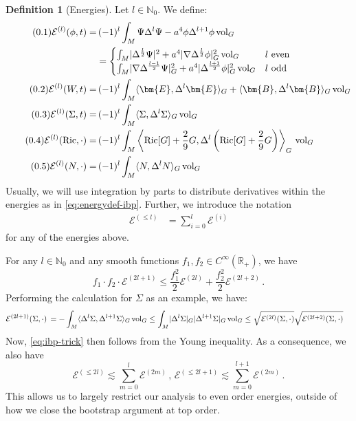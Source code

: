 \documentclass[11pt,leqno,textwidth=10cm]{amsart}
\numberwithin{equation}{section}
\theoremstyle{definition}
\newtheorem{definition}{Definition}[section]
\theoremstyle{plain}
\newcommand{\1}{\mathbbm{1}}
\newcommand{\E}{\mathcal{E}}
\newcommand{\N}{\mathbb{N}}
\newcommand{\R}{\mathbb{R}}
\newcommand{\Ric}{\text{\normalfont{Ric}}}
\newcommand{\vol}[1]{{\text{\normalfont{vol}}}_{#1}}
\newcommand{\Lap}{\Delta}
\newcommand{\numberthis}{\addtocounter{equation}{1}\tag{\theequation}}
\renewcommand{\theequation}{\arabic{section}.\arabic{equation}}
\newcommand{\RE}{\bm{E}}
\newcommand{\RB}{\bm{B}}
\begin{document}
\begin{definition}[Energies]\label{def:energies}
Let $l\in\N_0$. We define:
\begin{subequations}
\begin{align*}
\numberthis\E^{(l)}(\phi,t)=&\,(-1)^l\int_M\Psi\Lap^l\Psi-a^4\phi\Lap^{l+1}\phi\,\vol{G}\\
\label{eq:energydef-ibp}&=\begin{cases}
\int_M\lvert\Lap^\frac{l}2\Psi\rvert^2+a^4\lvert\nabla\Lap^\frac{l}2\phi\rvert_G^2\,\vol{G} & l\text{ even}\\
\int_M\lvert\nabla\Lap^\frac{l-1}2\Psi\rvert_G^2+a^4\lvert\Lap^\frac{l+1}2\phi\rvert_G^2\,\vol{G} & l\text{ odd}
\end{cases}\\
\numberthis\E^{(l)}(W,t)=&\,(-1)^l\int_M \langle\RE,\Lap^l \RE\rangle_G +\langle\RB,\Lap^l\RB\rangle_G\,\vol{G}\\
\numberthis\E^{(l)}(\Sigma,t)=&\,(-1)^l\int_M\langle\Sigma,\Lap^l\Sigma\rangle_G\,\vol{G}\\
\numberthis\E^{(l)}(\Ric,\cdot)=&\,(-1)^l\int_M\left\langle \Ric[G]+\frac29G,\Lap^l\left(\Ric[G]+\frac29G\right)\right\rangle_G\,\vol{G}\\
\numberthis\E^{(l)}(N,\cdot)=&\,(-1)^l\int_M\langle N,\Lap^lN\rangle_G\,\vol{G}
\end{align*}
\end{subequations}
Usually, we will use integration by parts to distribute derivatives within the energies as in \eqref{eq:energydef-ibp}. Further, we introduce the notation
\begin{align}
\E^{(\leq l)}&=\sum_{i=0}^l\E^{(i)}
\end{align}
for any of the energies above.
\end{definition}
\noindent For any $l\in\N_0$ and any smooth functions $f_1,f_2\in C^\infty(\R_+)$, we have
\begin{equation}\label{eq:ibp-trick}
f_1\cdot f_2\cdot\E^{(2l+1)}\leq \frac{f_1^2}2\E^{(2l)}+\frac{f_2^2}2\E^{(2l+2)}\,.
\end{equation}
Performing the calculation for $\Sigma$ as an example, we have:
\begin{align*}
\E^{(2l+1)}(\Sigma,\cdot)&\,=-\int_M \langle\Lap^l\Sigma,\Lap^{l+1}\Sigma\rangle_G\,\vol{G}\leq \int_M\lvert\Lap^l\Sigma\rvert_G\lvert\Lap^{l+1}\Sigma\rvert_G\,\vol{G}\leq \sqrt{\E^{(2l)}(\Sigma,\cdot)}\sqrt{\E^{(2l+2)}(\Sigma,\cdot)}
\end{align*}
Now, \eqref{eq:ibp-trick} then follows from the Young inequality. As a consequence, we also have
\begin{equation}\label{eq:drop-odd-en}
\E^{(\leq 2l)}\lesssim \sum_{m=0}^l\E^{(2m)}\,,\,\E^{(\leq 2l+1)}\lesssim\sum_{m=0}^{l+1}\E^{(2m)}\,.
\end{equation}
This allows us to largely restrict our analysis to even order energies, outside of how we close the bootstrap argument at top order.
\end{document}
